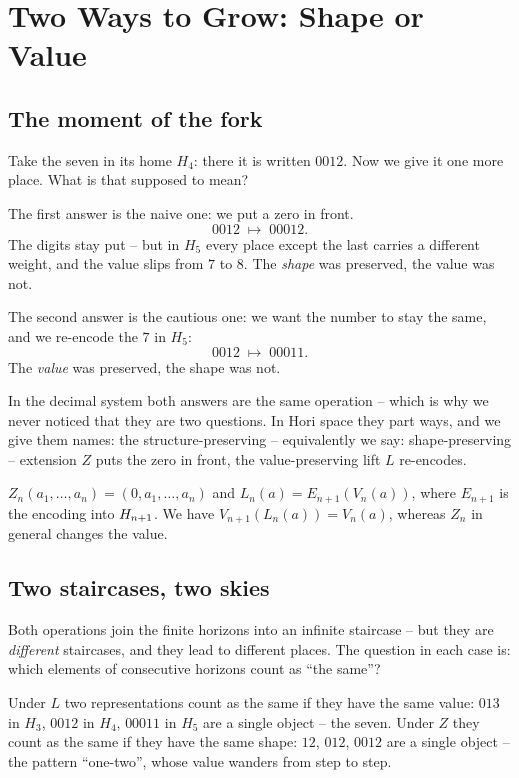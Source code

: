 \chapter{Two Ways to Grow: Shape or Value}
\label{ch:erweiterungen}


\section{The moment of the fork}

Take the seven in its home $H_4$: there it is written $0012$. Now
we give it one more place. What is that supposed to mean?

The first answer is the naive one: we put a zero in front.
\[
0012 \;\longmapsto\; 00012 .
\]
The digits stay put -- but in $H_5$ every place except the last
carries a different weight, and the value slips from $7$ to $8$.
The \emph{shape} was preserved, the value was not.

The second answer is the cautious one: we want the number to stay
the same, and we re-encode the $7$ in $H_5$:
\[
0012 \;\longmapsto\; 00011 .
\]
The \emph{value} was preserved, the shape was not.

In the decimal system both answers are the same operation -- which
is why we never noticed that they are two questions. In Hori space
they part ways, and we give them names: the structure-preserving
-- equivalently we say: shape-preserving -- extension $Z$ puts the
zero in front, the value-preserving lift $L$ re-encodes.

\begin{definition}[Register D5]
$Z_n(a_1,\ldots,a_n)=(0,a_1,\ldots,a_n)$ and
$L_n(a)=E_{n+1}(V_n(a))$, where $E_{n+1}$ is the encoding into
$H_{n+1}$. We have $V_{n+1}(L_n(a))=V_n(a)$, whereas $Z_n$ in
general changes the value.
\end{definition}

\section{Two staircases, two skies}

Both operations join the finite horizons into an infinite
staircase -- but they are \emph{different} staircases, and they
lead to different places. The question in each case is: which
elements of consecutive horizons count as ``the same''?

Under $L$ two representations count as the same if they have the
same value: $013$ in $H_3$, $0012$ in $H_4$, $00011$ in $H_5$ are
a single object -- the seven. Under $Z$ they count as the same if
they have the same shape: $12$, $012$, $0012$ are a single object
-- the pattern ``one-two'', whose value wanders from step to step.

